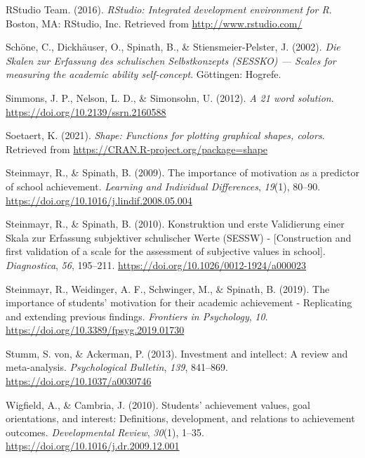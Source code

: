 \documentclass[
  man]{apa6}
\newlength{\cslhangindent}
\newlength{\cslentryspacingunit} %
\newenvironment{CSLReferences}[2] %
 {%
  \setlength{\parindent}{0pt}
  \ifodd #1
  \let\oldpar\par
  \def\par{\hangindent=\cslhangindent\oldpar}
  \fi
  \setlength{\parskip}{#2\cslentryspacingunit}
 }%
 {}
\begin{document}
\begin{CSLReferences}{1}{0}
\leavevmode{}%
RStudio Team. (2016). \emph{RStudio: Integrated development environment for {R}}. Boston, MA: RStudio, Inc. Retrieved from \url{http://www.rstudio.com/}

\leavevmode{}%
Schöne, C., Dickhäuser, O., Spinath, B., \& Stiensmeier-Pelster, J. (2002). \emph{{Die Skalen zur Erfassung des schulischen Selbstkonzepts (SESSKO) --- Scales for measuring the academic ability self-concept}}. G{ö}ttingen: Hogrefe.

\leavevmode{}%
Simmons, J. P., Nelson, L. D., \& Simonsohn, U. (2012). \emph{A 21 word solution}. \url{https://doi.org/10.2139/ssrn.2160588}

\leavevmode{}%
Soetaert, K. (2021). \emph{Shape: Functions for plotting graphical shapes, colors}. Retrieved from \url{https://CRAN.R-project.org/package=shape}

\leavevmode{}%
Steinmayr, R., \& Spinath, B. (2009). The importance of motivation as a predictor of school achievement. \emph{Learning and Individual Differences}, \emph{19}(1), 80--90. \url{https://doi.org/10.1016/j.lindif.2008.05.004}

\leavevmode{}%
Steinmayr, R., \& Spinath, B. (2010). {Konstruktion und erste Validierung einer Skala zur Erfassung subjektiver schulischer Werte (SESSW) - {[}Construction and first validation of a scale for the assessment of subjective values in school{]}}. \emph{Diagnostica}, \emph{56}, 195--211. \url{https://doi.org/10.1026/0012-1924/a000023}

\leavevmode{}%
Steinmayr, R., Weidinger, A. F., Schwinger, M., \& Spinath, B. (2019). The importance of students' motivation for their academic achievement - {R}eplicating and extending previous findings. \emph{Frontiers in Psychology}, \emph{10}. \url{https://doi.org/10.3389/fpsyg.2019.01730}

\leavevmode{}%
Stumm, S. von, \& Ackerman, P. (2013). Investment and intellect: A review and meta-analysis. \emph{Psychological Bulletin}, \emph{139}, 841--869. \url{https://doi.org/10.1037/a0030746}

\leavevmode{}%
Wigfield, A., \& Cambria, J. (2010). Students' achievement values, goal orientations, and interest: Definitions, development, and relations to achievement outcomes. \emph{Developmental Review}, \emph{30}(1), 1--35. \url{https://doi.org/10.1016/j.dr.2009.12.001}


\end{CSLReferences}
\end{document}
